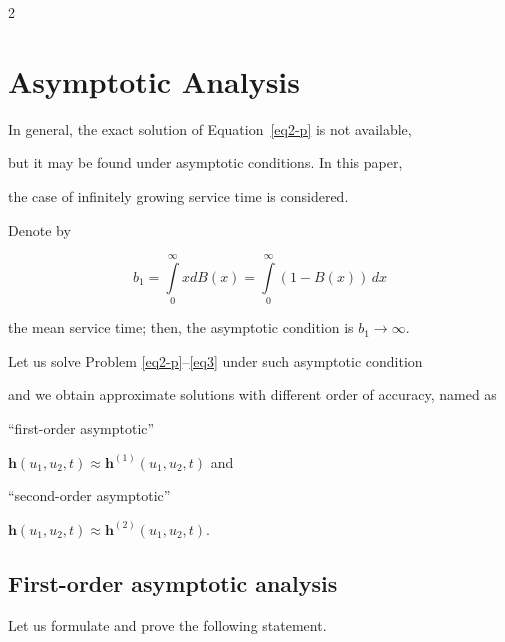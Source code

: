 \begin{multicols}{2}
\section{Asymptotic Analysis}





\noindent


In general, the exact solution of Equation~\eqref{eq2-p} is not available, 


but it may be found under asymptotic conditions. In this paper,  


the case of infinitely growing service time is considered.





Denote by


$$


b_1=\int\limits_0^\infty xdB(x)=\int\limits_0^\infty(1-B(x))\,dx


$$


the mean service time; then, the asymptotic condition is $b_1\to\infty$.





Let us solve Problem \eqref{eq2-p}--\eqref{eq3} under such asymptotic condition 


and we obtain  approximate solutions with different order of accuracy, named as 


``first-order asymptotic'' 


${\mathbf{h}}(u_1,u_2,t)\approx{\mathbf{h}}^{(1)}(u_1,u_2,t)$ and  


``second-order asymptotic'' 


${\mathbf{h}}(u_1,u_2,t)\approx{\mathbf{h}}^{(2)}(u_1,u_2,t)$.





\subsection{First-order asymptotic analysis}





\noindent


Let us formulate and prove the following statement.





\smallskip






\end{multicols}
